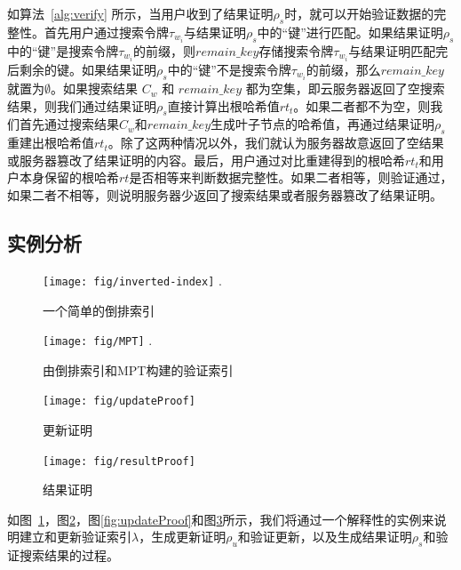 如算法~\ref{alg:verify} 所示，当用户收到了结果证明$\rho_s$时，就可以开始验证数据的完整性。首先用户通过搜索令牌$\tau_{w_i}$与结果证明$\rho_s$中的“键”进行匹配。如果结果证明$\rho_s$中的“键”是搜索令牌$\tau_{w_i}$的前缀，则$remain\_key$存储搜索令牌$\tau_{w_i}$与结果证明匹配完后剩余的键。如果结果证明$\rho_s$中的“键”不是搜索令牌$\tau_{w_i}$的前缀，那么$remain\_key$就置为$\emptyset$。如果搜索结果 $C_{w}$ 和 $remain\_key$ 都为空集，即云服务器返回了空搜索结果，则我们通过结果证明$\rho_s$直接计算出根哈希值$rt_t$。如果二者都不为空，则我们首先通过搜索结果$C_{w}$和$remain\_key$生成叶子节点的哈希值，再通过结果证明$\rho_s$重建出根哈希值$rt_t$。除了这两种情况以外，我们就认为服务器故意返回了空结果或服务器篡改了结果证明的内容。最后，用户通过对比重建得到的根哈希$rt_t$和用户本身保留的根哈希$rt$是否相等来判断数据完整性。如果二者相等，则验证通过，如果二者不相等，则说明服务器少返回了搜索结果或者服务器篡改了结果证明。



\subsection{实例分析}
\label{sec:example}

\begin{figure}[ht]
\centering
\texttt{[image: fig/inverted-index]}
\DeclareGraphicsExtensions.
\caption{一个简单的倒排索引}
\label{fig:inverted-index}
\end{figure}

\begin{figure}[ht]
\centering
\texttt{[image: fig/MPT]}
\DeclareGraphicsExtensions.
\caption{由倒排索引和MPT构建的验证索引}
\label{fig:MPT}
\end{figure}


\begin{figure}[ht]
  \begin{minipage}[b]{0.49\textwidth}
    \texttt{[image: fig/updateProof]}
    \caption{更新证明}
    \label{fig:updateProof}
  \end{minipage}
  \begin{minipage}[b]{0.49\textwidth}
    \texttt{[image: fig/resultProof]}
    \caption{结果证明}
    \label{fig:resultProof}
  \end{minipage}
\centering
\end{figure}

如图~\ref{fig:inverted-index}，图\ref{fig:MPT}，图\ref{fig:updateProof}和图\ref{fig:resultProof}所示，我们将通过一个解释性的实例来说明建立和更新验证索引$\lambda$，生成更新证明$\rho_u$和验证更新，以及生成结果证明$\rho_s$和验证搜索结果的过程。

